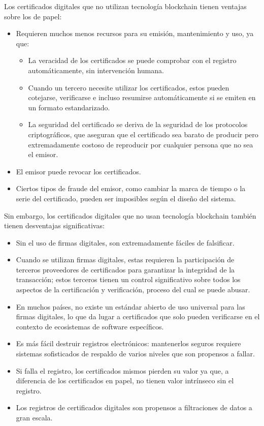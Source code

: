 Los certificados digitales que no utilizan tecnología blockchain tienen ventajas sobre los de papel:
\begin{itemize}
	\item Requieren muchos menos recursos para su emisión, mantenimiento y uso, ya que:
	\begin{itemize}
		\item La veracidad de los certificados se puede comprobar con el registro automáticamente, sin intervención humana.
		\item Cuando un tercero necesite utilizar los certificados, estos pueden cotejarse, verificarse e incluso resumirse automáticamente si se emiten en un formato estandarizado.
		\item La seguridad del certificado se deriva de la seguridad de los protocolos criptográficos, que aseguran que el certificado sea barato de producir pero extremadamente costoso de reproducir por cualquier persona que no sea el emisor.
	\end{itemize}
	\item El emisor puede revocar los certificados.
	\item Ciertos tipos de fraude del emisor, como cambiar la marca de tiempo o la serie del certificado, pueden ser imposibles según el diseño del sistema.
\end{itemize}
Sin embargo, los certificados digitales que no usan tecnología blockchain también tienen desventajas significativas:
\begin{itemize}
	\item Sin el uso de firmas digitales, son extremadamente fáciles de falsificar.
	\item Cuando se utilizan firmas digitales, estas requieren la participación de terceros proveedores de certificados para garantizar la integridad de la transacción; estos terceros tienen un control significativo sobre todos los aspectos de la certificación y verificación, proceso del cual se puede abusar.
	\item En muchos países, no existe un estándar abierto de uso universal para las firmas digitales, lo que da lugar a certificados que solo pueden verificarse en el contexto de ecosistemas de software específicos.
	\item Es más fácil destruir registros electrónicos: mantenerlos seguros requiere sistemas sofisticados de respaldo de varios niveles que son propensos a fallar.
	\item Si falla el registro, los certificados mismos pierden su valor ya que, a diferencia de los certificados en papel, no tienen valor intrínseco sin el registro.
	\item Los registros de certificados digitales son propensos a filtraciones de datos a gran escala.
\end{itemize}

